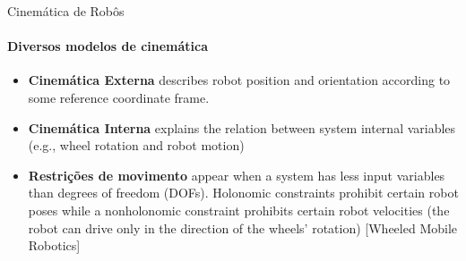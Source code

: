 \documentclass{beamer}
\begin{document}
\begin{frame}{Cinemática de Robôs}
    \framesubtitle{Diversos modelos de cinemática}
    \begin{itemize}
        \item \textbf{Cinemática Externa} describes robot position and orientation according to
              some reference coordinate frame.
        \item \textbf{Cinemática Interna} explains the relation between system internal variables
              (e.g., wheel rotation and robot motion)
        \item \textbf{Restrições de movimento} appear when a system has less input variables than
              degrees of freedom (DOFs). Holonomic constraints prohibit certain
              robot poses while a nonholonomic constraint prohibits certain robot
              velocities (the robot can drive only in the direction of the wheels’
              rotation) [Wheeled Mobile Robotics]
    \end{itemize}
\end{frame}
\end{document}
